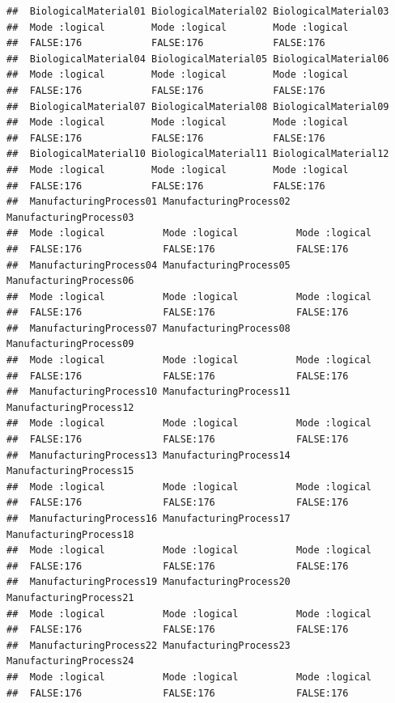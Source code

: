 \documentclass[
  11pt,
]{article}
\begin{document}
\begin{verbatim}
##  BiologicalMaterial01 BiologicalMaterial02 BiologicalMaterial03
##  Mode :logical        Mode :logical        Mode :logical       
##  FALSE:176            FALSE:176            FALSE:176           
##  BiologicalMaterial04 BiologicalMaterial05 BiologicalMaterial06
##  Mode :logical        Mode :logical        Mode :logical       
##  FALSE:176            FALSE:176            FALSE:176           
##  BiologicalMaterial07 BiologicalMaterial08 BiologicalMaterial09
##  Mode :logical        Mode :logical        Mode :logical       
##  FALSE:176            FALSE:176            FALSE:176           
##  BiologicalMaterial10 BiologicalMaterial11 BiologicalMaterial12
##  Mode :logical        Mode :logical        Mode :logical       
##  FALSE:176            FALSE:176            FALSE:176           
##  ManufacturingProcess01 ManufacturingProcess02 ManufacturingProcess03
##  Mode :logical          Mode :logical          Mode :logical         
##  FALSE:176              FALSE:176              FALSE:176             
##  ManufacturingProcess04 ManufacturingProcess05 ManufacturingProcess06
##  Mode :logical          Mode :logical          Mode :logical         
##  FALSE:176              FALSE:176              FALSE:176             
##  ManufacturingProcess07 ManufacturingProcess08 ManufacturingProcess09
##  Mode :logical          Mode :logical          Mode :logical         
##  FALSE:176              FALSE:176              FALSE:176             
##  ManufacturingProcess10 ManufacturingProcess11 ManufacturingProcess12
##  Mode :logical          Mode :logical          Mode :logical         
##  FALSE:176              FALSE:176              FALSE:176             
##  ManufacturingProcess13 ManufacturingProcess14 ManufacturingProcess15
##  Mode :logical          Mode :logical          Mode :logical         
##  FALSE:176              FALSE:176              FALSE:176             
##  ManufacturingProcess16 ManufacturingProcess17 ManufacturingProcess18
##  Mode :logical          Mode :logical          Mode :logical         
##  FALSE:176              FALSE:176              FALSE:176             
##  ManufacturingProcess19 ManufacturingProcess20 ManufacturingProcess21
##  Mode :logical          Mode :logical          Mode :logical         
##  FALSE:176              FALSE:176              FALSE:176             
##  ManufacturingProcess22 ManufacturingProcess23 ManufacturingProcess24
##  Mode :logical          Mode :logical          Mode :logical         
##  FALSE:176              FALSE:176              FALSE:176             

\end{verbatim}
\end{document}
